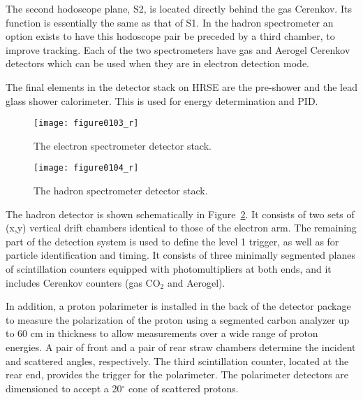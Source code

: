 The second hodoscope plane, S2, is located directly behind the 
gas Cerenkov.  Its function is essentially the same as that of S1.  
In the hadron spectrometer an option exists to have this hodoscope 
pair be preceded by a third chamber, to improve tracking.
 Each of the two spectrometers 
have gas and Aerogel Cerenkov detectors which can be used
 when they are in electron detection mode.

The final elements in the detector stack on HRSE are 
the pre-shower and the lead glass shower 
calorimeter.  This is used for energy determination and PID.

\begin{figure}[tbp]
\begin{center}
\texttt{[image: figure0103\_r]}
{\linespread{1.}
\caption[Spectrometers: Electron Arm Detectors]{The electron spectrometer detector stack.}
\label{fig:hrs_electron_det}}
\end{center}
\end{figure}

\begin{figure}[tbp]
\begin{center}
\texttt{[image: figure0104\_r]}
{\linespread{1.}
\caption[Spectrometers: Hadron Arm Detectors]{The hadron spectrometer detector stack.}
\label{fig:hrs_hadron_det}}
\end{center}
\end{figure}


The hadron detector is shown schematically in 
Figure~\ref{fig:hrs_hadron_det}.  It consists 
of two sets of (x,y) vertical drift chambers identical to those of the 
electron arm.  The remaining part of the detection system is used to 
define the level 1 trigger, as well as for particle identification and 
timing.  It consists of three minimally segmented planes of 
scintillation counters equipped with photomultipliers at both ends, and 
it includes Cerenkov counters (gas CO$_2$ and Aerogel).

In addition, a proton polarimeter is installed in the back of the 
detector package to measure the polarization of the proton using a 
segmented carbon analyzer up to 60 cm in thickness to allow measurements 
over a wide range of proton energies.  A pair of front and a pair of 
rear straw chambers determine the incident and 
scattered angles, respectively.  The third scintillation counter, 
located at the rear end, provides the trigger for the polarimeter.  The 
polarimeter detectors are dimensioned to accept a 20$^{\circ}$ cone of 
scattered protons.

